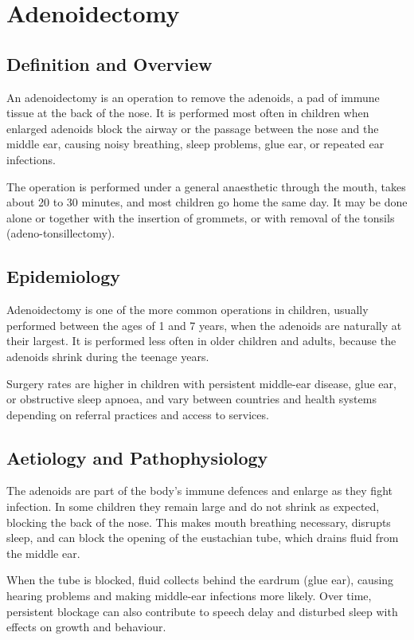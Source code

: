 \chapter{Adenoidectomy}

\section*{Definition and Overview}
An adenoidectomy is an operation to remove the adenoids, a pad of immune tissue at the back of the nose. It is performed most often in children when enlarged adenoids block the airway or the passage between the nose and the middle ear, causing noisy breathing, sleep problems, glue ear, or repeated ear infections.

The operation is performed under a general anaesthetic through the mouth, takes about 20 to 30 minutes, and most children go home the same day. It may be done alone or together with the insertion of grommets, or with removal of the tonsils (adeno-tonsillectomy).

\section*{Epidemiology}
Adenoidectomy is one of the more common operations in children, usually performed between the ages of 1 and 7 years, when the adenoids are naturally at their largest. It is performed less often in older children and adults, because the adenoids shrink during the teenage years.

Surgery rates are higher in children with persistent middle-ear disease, glue ear, or obstructive sleep apnoea, and vary between countries and health systems depending on referral practices and access to services.

\section*{Aetiology and Pathophysiology}
The adenoids are part of the body's immune defences and enlarge as they fight infection. In some children they remain large and do not shrink as expected, blocking the back of the nose. This makes mouth breathing necessary, disrupts sleep, and can block the opening of the eustachian tube, which drains fluid from the middle ear.

When the tube is blocked, fluid collects behind the eardrum (glue ear), causing hearing problems and making middle-ear infections more likely. Over time, persistent blockage can also contribute to speech delay and disturbed sleep with effects on growth and behaviour.

